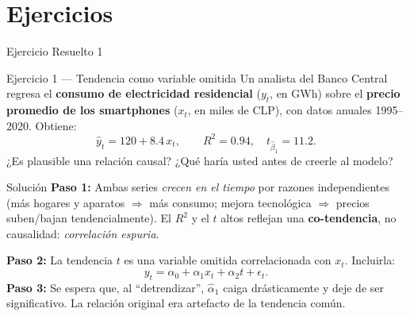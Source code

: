 \documentclass{beamer}
\begin{document}
\section{Ejercicios}

\begin{frame}{Ejercicio Resuelto 1}

\begin{block}{Ejercicio 1 --- Tendencia como variable omitida}
Un analista del Banco Central regresa el \textbf{consumo de electricidad residencial} ($y_t$, en GWh) sobre el \textbf{precio promedio de los smartphones} ($x_t$, en miles de CLP), con datos anuales 1995--2020. Obtiene:
\[
\hat y_t = 120 + 8.4\, x_t, \qquad R^2 = 0.94,\quad t_{\hat\beta_1}=11.2.
\]
¿Es plausible una relación causal? ¿Qué haría usted antes de creerle al modelo?
\end{block}

\pause

\begin{exampleblock}{Solución}
\textbf{Paso 1:} Ambas series \emph{crecen en el tiempo} por razones independientes (más hogares y aparatos $\Rightarrow$ más consumo; mejora tecnológica $\Rightarrow$ precios suben/bajan tendencialmente). El $R^2$ y el $t$ altos reflejan una \textbf{co-tendencia}, no causalidad: \emph{correlación espuria}.

\textbf{Paso 2:} La tendencia $t$ es una variable omitida correlacionada con $x_t$. Incluirla:
\[
y_t = \alpha_0 + \alpha_1 x_t + \alpha_2 t + \epsilon_t.
\]
\textbf{Paso 3:} Se espera que, al ``detrendizar'', $\hat\alpha_1$ caiga drásticamente y deje de ser significativo. La relación original era artefacto de la tendencia común.
\end{exampleblock}

\end{frame}
\end{document}
